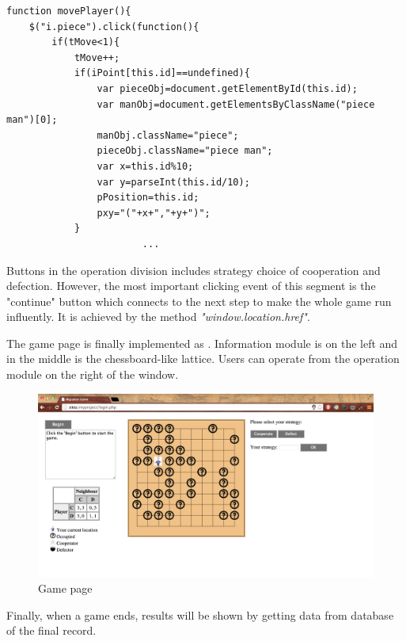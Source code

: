 \begin{lstlisting}[caption=Part of the code to move the player]
function movePlayer(){
	$("i.piece").click(function(){
		if(tMove<1){
			tMove++;
			if(iPoint[this.id]==undefined){
				var pieceObj=document.getElementById(this.id);
				var manObj=document.getElementsByClassName("piece man")[0];
				manObj.className="piece";
				pieceObj.className="piece man";
				var x=this.id%10;
				var y=parseInt(this.id/10);
				pPosition=this.id;
				pxy="("+x+","+y+")";
			}
                    	...

\end{lstlisting}

Buttons in the operation division includes strategy choice of cooperation and defection. However, the most important clicking event of this segment is the "continue" button which connects to the next step to make the whole game run influently. It is achieved by the method \textit{"window.location.href"}.

The game page is finally implemented as . Information module is on the left and in the middle is the chessboard-like lattice. Users can operate from the operation module on the right of the window.
\begin{figure}[!htb]
  \centering
  \includegraphics[width=14cm]{game.png}
  \caption{Game page}
  \label{Figure:game}
\end{figure}

Finally, when a game ends, results will be shown by getting data from database of the final record.

